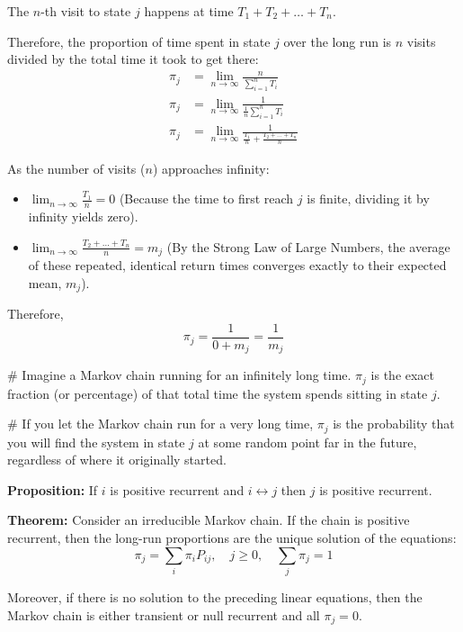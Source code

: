 \documentclass[12pt,a4paper]{article}
\begin{document}
The $n$-th visit to state $j$ happens at time $T_1 + T_2 + \dots + T_n$.

Therefore, the proportion of time spent in state $j$ over the long run is $n$ visits divided by the total time it took to get there:
\begin{align*}
    \pi_j &= \lim_{n \to \infty} \frac{n}{\sum_{i=1}^n T_i} \\
    \pi_j &= \lim_{n \to \infty} \frac{1}{\frac{1}{n} \sum_{i=1}^n T_i} \\
    \pi_j &= \lim_{n \to \infty} \frac{1}{\frac{T_1}{n} + \frac{T_2 + \dots + T_n}{n}}
\end{align*}

As the number of visits ($n$) approaches infinity:
\begin{itemize}
    \item $\lim_{n \to \infty} \frac{T_1}{n} = 0$ (Because the time to first reach $j$ is finite, dividing it by infinity yields zero).
    \item $\lim_{n \to \infty} \frac{T_2 + \dots + T_n}{n} = m_j$ (By the Strong Law of Large Numbers, the average of these repeated, identical return times converges exactly to their expected mean, $m_j$).
\end{itemize}

Therefore,
\[ \pi_j = \frac{1}{0 + m_j} = \frac{1}{m_j} \]

\# Imagine a Markov chain running for an infinitely long time. $\pi_j$ is the exact fraction (or percentage) of that total time the system spends sitting in state $j$.

\# If you let the Markov chain run for a very long time, $\pi_j$ is the probability that you will find the system in state $j$ at some random point far in the future, regardless of where it originally started.

\textbf{Proposition:} If $i$ is positive recurrent and $i \leftrightarrow j$ then $j$ is positive recurrent.

\textbf{Theorem:} Consider an irreducible Markov chain. If the chain is positive recurrent, then the long-run proportions are the unique solution of the equations:
\[ \pi_j = \sum_i \pi_i P_{ij}, \quad j \ge 0, \quad \sum_j \pi_j = 1 \]

Moreover, if there is no solution to the preceding linear equations, then the Markov chain is either transient or null recurrent and all $\pi_j = 0$.
\end{document}
